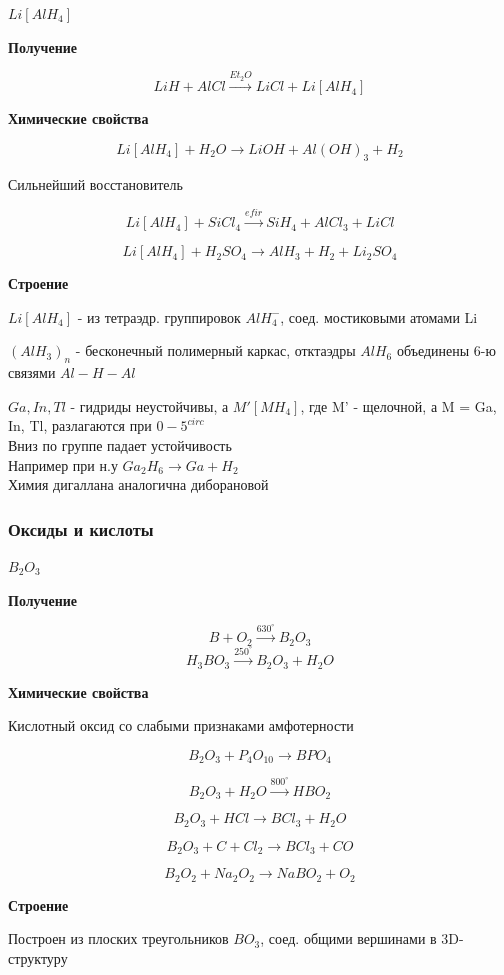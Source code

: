 $Li[AlH_4]$

\textbf{Получение}

$$LiH + AlCl \xrightarrow{Et_2O} LiCl + Li[AlH_4]$$

\textbf{Химические свойства}

$$Li[AlH_4] + H_2O \rightarrow LiOH + Al(OH)_3 + H_2$$

Сильнейший восстановитель

$$Li[AlH_4] + SiCl_4 \xrightarrow{efir} SiH_4 + AlCl_3 + LiCl$$

$$Li[AlH_4]  + H_2SO_4 \rightarrow AlH_3 + H_2 +Li_2SO_4$$

\textbf{Строение}

$Li[AlH_4]$ - из тетраэдр. группировок $AlH_4^-$, соед. мостиковыми атомами Li

$(AlH_3)_n$ - бесконечный полимерный каркас, отктаэдры $AlH_6$ объединены 6-ю связями $Al-H-Al$


$Ga, In, Tl$ - гидриды неустойчивы, а $M'[MH_4]$, где M' - щелочной,  а M = Ga, In, Tl, разлагаются при $0-5^{circ}$\\
Вниз по группе падает устойчивость\\

Например при н.у $Ga_2H_6 \rightarrow Ga + H_2$\\
Химия дигаллана аналогична диборановой

\subsubsection*{Оксиды и кислоты}

$B_2O_3$

\textbf{Получение}

$$B + O_2 \xrightarrow{630^{\circ}} B_2O_3$$
$$H_3BO_3 \xrightarrow{250^{\circ}} B_2O_3 + H_2O$$

\textbf{Химические свойства}

Кислотный оксид со слабыми признаками амфотерности

$$B_2O_3 + P_4O_{10} \rightarrow BPO_4$$

$$B_2O_3 + H_2O \xrightarrow{800^{\circ}} HBO_2$$

$$B_2O_3 + HCl \rightarrow BCl_3 + H_2O$$

$$B_2O_3 + C + Cl_2 \rightarrow BCl_3 + CO$$

$$B_2O_2 + Na_2O_2 \rightarrow NaBO_2 + O_2$$

\textbf{Строение}

Построен из плоских треугольников $BO_3$, соед. общими вершинами в 3D-структуру

